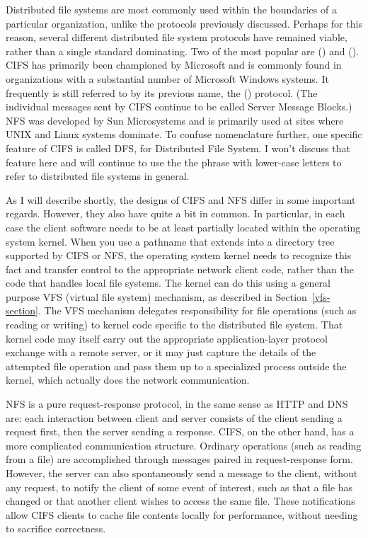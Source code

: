 Distributed file systems are most commonly used within the boundaries
of a particular organization, unlike the protocols previously
discussed.  Perhaps for this reason, several different distributed
file system protocols have remained viable, rather than a single
standard dominating.  Two of the most popular are 
() and 
().  CIFS has primarily been championed by
Microsoft and is commonly found in organizations with a substantial
number of Microsoft Windows systems.  It frequently is still referred
to by its previous name, the  () protocol.  (The individual messages sent by CIFS continue to be
called Server Message Blocks.)  NFS was developed by Sun Microsystems
and is primarily used at sites where UNIX and Linux systems dominate.
To confuse nomenclature further, one specific feature of CIFS is
called DFS, for Distributed File System.  I won't discuss that feature
here and will continue to use the the phrase with lower-case letters to
refer to distributed file systems in general.

As I will describe shortly, the designs of CIFS and NFS differ in some
important regards.  However, they also have quite a bit in common.  In
particular, in each case the client software needs to be at least
partially located within the operating system kernel.  When you use a
pathname that extends into a directory tree supported by CIFS or NFS,
the operating system kernel needs to recognize this fact and transfer
control to the appropriate network client code, rather than the code
that handles local file systems. The kernel can do this using a general
purpose VFS (virtual file system) mechanism, as described in
Section~\ref{vfs-section}.  The VFS mechanism delegates responsibility
for file operations (such as reading or writing) to kernel code
specific to the distributed file system.  That kernel code may itself
carry out the appropriate application-layer protocol exchange with a
remote server, or it may just capture the details of the attempted
file operation and pass them up to a specialized process outside the
kernel, which actually does the network communication.

NFS is a pure request-response protocol, in the same sense as HTTP and
DNS are: each interaction between client and server consists of the
client sending a request first, then the server sending a response.
CIFS, on the other hand, has a more complicated communication
structure. Ordinary operations (such as reading from a file) are
accomplished through messages paired in request-response form.
However, the server can also spontaneously send a message to the
client, without any request, to notify the client of some event of
interest, such as that a file has changed or that another client
wishes to access the same file.  These notifications allow CIFS
clients to cache file contents locally for performance, without
needing to sacrifice correctness.

